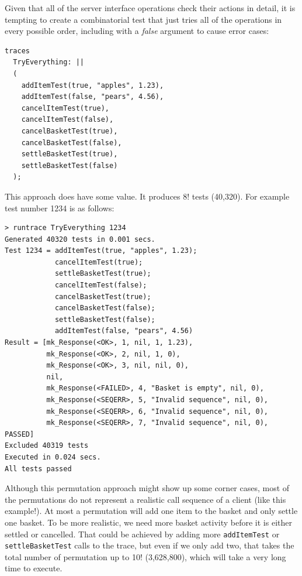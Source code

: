 \documentclass{overturerepchap}
\begin{document}
\noindent Given that all of the server interface operations check their actions in detail,
it is tempting to create a combinatorial test that just tries all of the
operations in every possible order, including with a \emph{false} argument to
cause error cases:

\small
\begin{lstlisting}
traces
  TryEverything: ||
  (
    addItemTest(true, "apples", 1.23),
    addItemTest(false, "pears", 4.56),
    cancelItemTest(true),
    cancelItemTest(false),
    cancelBasketTest(true),
    cancelBasketTest(false),
    settleBasketTest(true),
    settleBasketTest(false)
  );
\end{lstlisting}
\normalsize

\noindent This approach does have some value. It produces 8! tests (40,320).
For example test number 1234 is as follows:

\scriptsize
\lstset{style=tool,language=}
\begin{lstlisting}
> runtrace TryEverything 1234
Generated 40320 tests in 0.001 secs. 
Test 1234 = addItemTest(true, "apples", 1.23);
            cancelItemTest(true);
            settleBasketTest(true);
            cancelItemTest(false);
            cancelBasketTest(true);
            cancelBasketTest(false);
            settleBasketTest(false);
            addItemTest(false, "pears", 4.56)
Result = [mk_Response(<OK>, 1, nil, 1, 1.23),
          mk_Response(<OK>, 2, nil, 1, 0),
          mk_Response(<OK>, 3, nil, nil, 0),
          nil,
          mk_Response(<FAILED>, 4, "Basket is empty", nil, 0),
          mk_Response(<SEQERR>, 5, "Invalid sequence", nil, 0),
          mk_Response(<SEQERR>, 6, "Invalid sequence", nil, 0),
          mk_Response(<SEQERR>, 7, "Invalid sequence", nil, 0), PASSED]
Excluded 40319 tests
Executed in 0.024 secs. 
All tests passed
\end{lstlisting}
\lstset{style=mystyle}
\lstset{language=VDM++}
\normalsize

\noindent Although this permutation approach might show up some corner cases,
most of the permutations do not represent a realistic call sequence of a
client (like this example!). At most a permutation will add one item to the
basket and only settle one basket. To be more realistic, we need more basket
activity before it is either settled or cancelled. That could be achieved by
adding more \texttt{addItemTest} or \texttt{settleBasketTest} calls to the
trace, but even if we only add two, that takes the total number of permutation
up to 10! (3,628,800), which will take a very long time to execute.
\end{document}
